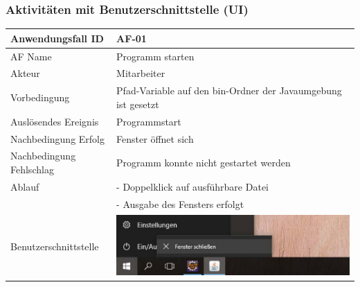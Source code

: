 \documentclass[12pt]{article}
\begin{document}
\subsubsection{Aktivitäten mit Benutzerschnittstelle (UI)}
\begin{tabularx}{\textwidth}{|l|X|} \hline
Anwendungsfall ID&AF-01\\ \hline
AF Name&Programm starten\\ \hline
Akteur&Mitarbeiter\\ \hline
Vorbedingung&Pfad-Variable auf den bin-Ordner der Javaumgebung ist gesetzt\\ \hline
Auslösendes Ereignis&Programmstart\\ \hline
Nachbedingung Erfolg&Fenster öffnet sich\\ \hline
Nachbedingung Fehlschlag&Programm konnte nicht gestartet werden\\ \hline
Ablauf&- Doppelklick auf ausführbare Datei\\&- Ausgabe des Fensters erfolgt \\ \hline
Benutzerschnittstelle&\includegraphics[scale=0.33]{Beenden.pdf} \\ \hline
\end{tabularx}\\
\end{document}
